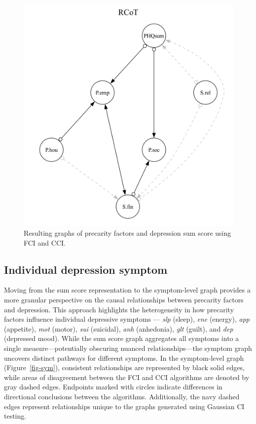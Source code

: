 \documentclass[
]{article}
\begin{document}
\begin{figure}
\begin{minipage}{0.50\linewidth}
{\includegraphics[width=1\textwidth,height=\textheight]{img/rcot_dot.png}

}


\end{minipage}%

\caption{\label{fig-sum}Resulting graphs of precarity factors and
depression sum score using FCI and CCI.}

\end{figure}%

\subsection{Individual depression
symptom}\label{individual-depression-symptom}

Moving from the sum score representation to the symptom-level graph
provides a more granular perspective on the causal relationships between
precarity factors and depression. This approach highlights the
heterogeneity in how precarity factors influence individual depressive
symptoms --- \emph{slp} (sleep), \emph{ene} (energy), \emph{app}
(appetite), \emph{mot} (motor), \emph{sui} (suicidal), \emph{anh}
(anhedonia), \emph{glt} (guilt), and \emph{dep} (depressed mood). While
the sum score graph aggregates all symptoms into a single
measure---potentially obscuring nuanced relationships---the symptom
graph uncovers distinct pathways for different symptoms. In the
symptom-level graph (Figure~\ref{fig-sym}), consistent relationships are
represented by black solid edges, while areas of disagreement between
the FCI and CCI algorithms are denoted by gray dashed edges. Endpoints
marked with circles indicate differences in directional conclusions
between the algorithms. Additionally, the navy dashed edges represent
relationships unique to the graphs generated using Gaussian CI testing.
\end{document}
